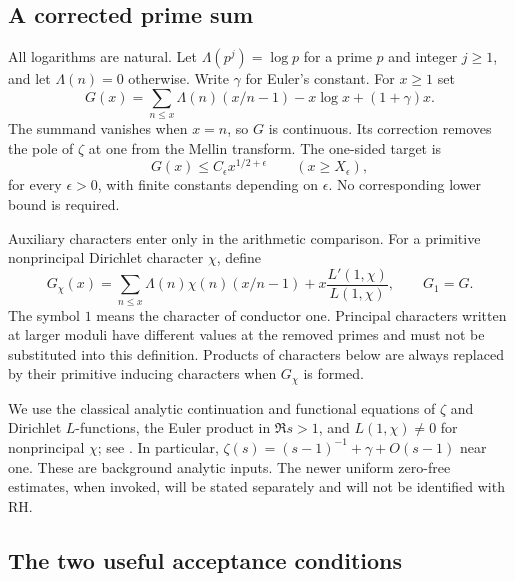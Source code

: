 \subsection{A corrected prime sum}

All logarithms are natural. Let $\Lambda(p^j)=\log p$ for a prime $p$
and integer $j\ge1$, and let $\Lambda(n)=0$ otherwise. Write $\gamma$
for Euler's constant. For $x\ge1$ set
\begin{equation}\label{rh-G}
 G(x)=\sum_{n\le x}\Lambda(n)(x/n-1)-x\log x+(1+\gamma)x.
\end{equation}
The summand vanishes when $x=n$, so $G$ is continuous. Its correction
removes the pole of $\zeta$ at one from the Mellin transform. The
one-sided target is
\begin{equation}\label{rh-simple-target}
 G(x)\le C_\epsilon x^{1/2+\epsilon}
       \qquad(x\ge X_\epsilon),
\end{equation}
for every $\epsilon>0$, with finite constants depending on $\epsilon$.
No corresponding lower bound is required.

Auxiliary characters enter only in the arithmetic comparison. For a
primitive nonprincipal Dirichlet character $\chi$, define
\begin{equation}\label{rh-Gchi}
 G_\chi(x)=\sum_{n\le x}\Lambda(n)\chi(n)(x/n-1)
                   +x\frac{L'(1,\chi)}{L(1,\chi)},
 \qquad G_1=G.
\end{equation}
The symbol $1$ means the character of conductor one. Principal
characters written at larger moduli have different values at the
removed primes and must not be substituted into this definition.
Products of characters below are always replaced by their primitive
inducing characters when $G_\chi$ is formed.

We use the classical analytic continuation and functional equations
of $\zeta$ and Dirichlet $L$-functions, the Euler product in $\Re s>1$,
and $L(1,\chi)\ne0$ for nonprincipal $\chi$; see
\cite{rh-dlmf-zeta,rh-dlmf-dirichlet}. In particular,
$\zeta(s)=(s-1)^{-1}+\gamma+O(s-1)$ near one. These are background
analytic inputs. The newer uniform zero-free estimates, when invoked,
will be stated separately and will not be identified with RH.

\subsection{The two useful acceptance conditions}

